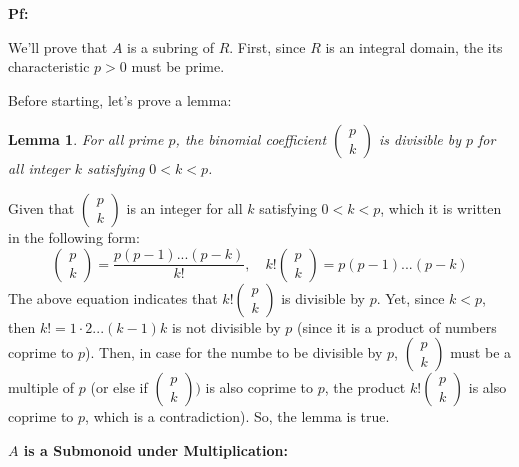 \documentclass{article}
\newtheorem{lemma}{Lemma}
\begin{document}
\textbf{Pf:}

We'll prove that $A$ is a subring of $R$. First, since $R$ is an integral domain, the its characteristic $p>0$ must be prime.

\hfill

Before starting, let's prove a lemma:
\begin{lemma}
    For all prime $p$, the binomial coefficient $\begin{pmatrix}
        p\\k
    \end{pmatrix}$ is divisible by $p$ for all integer $k$ satisfying $0<k<p$.
\end{lemma}

Given that $\begin{pmatrix}
    p\\k
\end{pmatrix}$ is an integer for all $k$ satisfying $0<k<p$, which it is written in the following form:
$$\begin{pmatrix}
    p\\k
\end{pmatrix}=\frac{p(p-1)...(p-k)}{k!},\quad k!\begin{pmatrix}
    p\\k
\end{pmatrix}=p(p-1)...(p-k)$$
The above equation indicates that $k!\begin{pmatrix}
    p\\k
\end{pmatrix}$ is divisible by $p$. Yet, since $k<p$, then $k!=1\cdot 2...(k-1)k$ is not divisible by $p$ (since it is a product of numbers coprime to $p$).
Then, in case for the numbe to be divisible by $p$, $\begin{pmatrix}
    p\\k
\end{pmatrix}$ must be a multiple of $p$ (or else if $\begin{pmatrix}
    p\\k
\end{pmatrix})$ is also coprime to $p$, the product $k!\begin{pmatrix}
    p\\k
\end{pmatrix}$ is also coprime to $p$, which is a contradiction). So, the lemma is true.

\hfill

\hfill

\textbf{$A$ is a Submonoid under Multiplication:}
\end{document}
